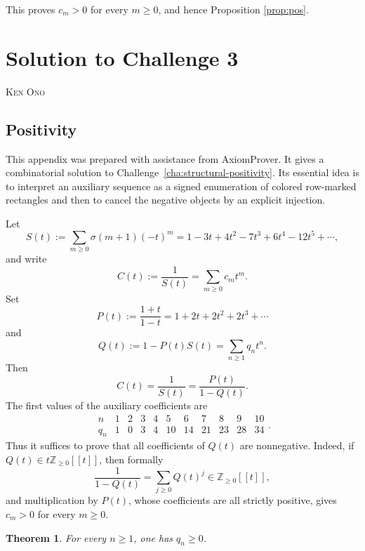 \documentclass[11pt,reqno]{amsart}
\theoremstyle{plain}
\newtheorem{theorem}{Theorem}[section]
\theoremstyle{remark}
\theoremstyle{definition}
\numberwithin{equation}{section}
\newcommand{\auxftn}{P}
\newcommand{\auxprodftn}{Q}
\newcommand{\coefauxprod}{q}
\begin{document}
This proves $c_m>0$ for every $m\geq 0$, and hence
Proposition \ref{prop:pos}.



\section{\label{appxB}Solution to Challenge 3}\label{app:ono-challenge3}

\begin{center}
\textsc%
{Ken Ono}
\end{center}

\noindent
\subsection{Positivity}
This appendix was prepared 
with assistance from AxiomProver. It gives a combinatorial solution to Challenge~\ref{cha:structural-positivity}. Its essential idea is to interpret an auxiliary sequence as a signed enumeration of colored row-marked rectangles and then to cancel the negative objects by an explicit injection.

\medskip

Let
\[
  S(t):=\sum_{m\ge 0}\sigma(m+1)(-t)^m
       =1-3t+4t^2-7t^3+6t^4-12t^5+\cdots,
\]
and write
\[
  C(t):=
\frac1{S(t)}=\sum_{m\ge0}c_m t^m.
\]
Set
\[
  \auxftn \left( t\right) :=\frac{1+t}{1-t}=1+2t+2t^2+2t^3+\cdots
\]
and
\[
  \auxprodftn (t):=1-\auxftn (t)S(t)=\sum_{n\ge1}\coefauxprod _n t^n.
\]
Then
\begin{equation}\label{eq:ono-C-PQ}
  C(t)=
\frac1{S(t)}=\frac{\auxftn (t)}{1-\auxprodftn(t)}.
\end{equation}
The first values of the auxiliary coefficients are
\[
\begin{array}{c|cccccccccc}
 n   &1&2&3&4&5&6&7&8&9&10\\ \hline
 \coefauxprod _n &1&0&3&4&10&14&21&23&28&34
\end{array}
.
\]
Thus it suffices to prove that all coefficients of $\auxprodftn(t)$ are nonnegative. Indeed, if $\auxprodftn(t)\in t\mathbb Z_{\ge0}[[t]]$, then formally
\[
  \frac1{1-\auxprodftn(t)}=\sum_{j\ge0}\auxprodftn (t)^j\in\mathbb Z_{\ge0}[[t]],
\]
and multiplication by $\auxftn (t)$, whose coefficients are all strictly positive, gives $c_m>0$ for every $m\ge0$.

\begin{theorem}\label{thm:ono-q-nonnegative}
For every $n\ge1$, one has $\coefauxprod _n\ge0$.
\end{theorem}
\end{document}
